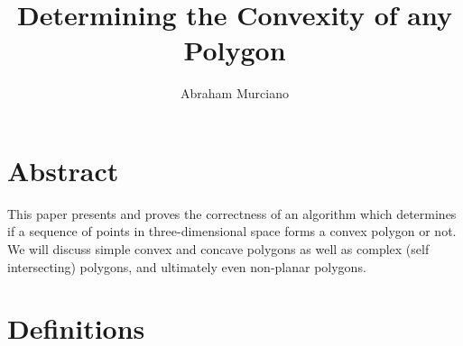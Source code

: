 \documentclass{article}
\title{Determining the Convexity of any Polygon}
\author{Abraham Murciano}
\begin{document}
\maketitle

\section{Abstract}

This paper presents and proves the correctness of an algorithm which determines if a sequence of points in three-dimensional space forms a convex polygon or not. We will discuss simple convex and concave polygons as well as complex (self intersecting) polygons, and ultimately even non-planar polygons.

\section{Definitions}
\end{document}
